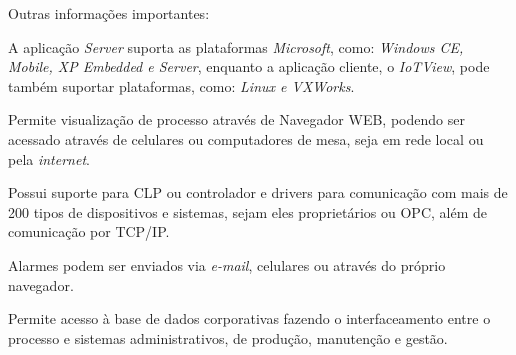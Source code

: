     \begin{figure}[!h]
    \end{figure}
    
    Outras informações importantes:
    
    \begin{alineascomponto}
    	\item A aplicação \textit{Server} suporta as plataformas \textit{Microsoft}, como: \textit{Windows CE, Mobile, XP Embedded e Server}, enquanto a aplicação cliente, o \textit{IoTView}, pode também suportar plataformas, como: \textit{Linux e VXWorks}.
    	\item Permite visualização de processo através de Navegador \gls{WEB}, podendo ser acessado através de celulares ou computadores de mesa, seja em rede local ou pela \textit{internet}.
    	\item Possui suporte para \gls{CLP} ou controlador e drivers para comunicação com mais de 200 tipos de dispositivos e sistemas, sejam eles proprietários ou \gls{OPC}, além de comunicação por \gls{TCP/IP}.
    	\item Alarmes podem ser enviados via \textit{e-mail}, celulares ou através do próprio navegador.
    	\item Permite acesso à base de dados corporativas fazendo o interfaceamento entre o processo e sistemas administrativos, de produção, manutenção e gestão.
    \end{alineascomponto}


